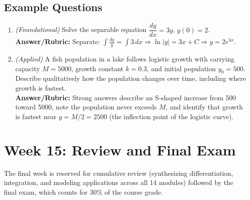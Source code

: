 \documentclass{article}
\begin{document}
\subsection*{Example Questions}
\begin{enumerate}[leftmargin=*]
  \item \textit{(Foundational)} Solve the separable equation $\dfrac{dy}{dx} = 3y$, $y(0)=2$. \\
  \textbf{Answer/Rubric:} Separate: $\int \frac{dy}{y} = \int 3\,dx \Rightarrow \ln|y|=3x+C \Rightarrow y=2e^{3x}$.
  \item \textit{(Applied)} A fish population in a lake follows logistic growth with carrying capacity $M=5000$, growth constant $k=0.3$, and initial population $y_0=500$. Describe qualitatively how the population changes over time, including where growth is fastest. \\
  \textbf{Answer/Rubric:} Strong answers describe an S-shaped increase from 500 toward 5000, note the population never exceeds $M$, and identify that growth is fastest near $y=M/2=2500$ (the inflection point of the logistic curve).
\end{enumerate}



\section*{Week 15: Review and Final Exam}
The final week is reserved for cumulative review (synthesizing differentiation, integration, and modeling applications across all 14 modules) followed by the final exam, which counts for 30\% of the course grade.
\end{document}
